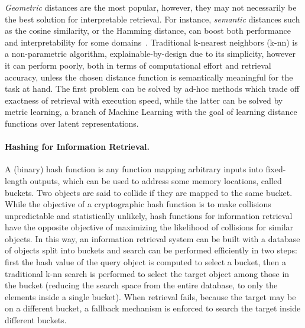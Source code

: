 \textit{Geometric} distances are the most popular, however, they may not necessarily be the best solution for interpretable retrieval. For instance, \textit{semantic} distances such as the cosine similarity, or the Hamming distance, can boost both performance and interpretability for some domains~\cite{norouzi2012hamming}.
%
Traditional k-nearest neighbors (k-nn) is a non-parametric algorithm, explainable-by-design due to its simplicity, however it can perform poorly, both in terms of computational effort and retrieval accuracy, unless the chosen distance function is semantically meaningful for the task at hand.
The first problem can be solved by ad-hoc methods which trade off exactness of retrieval with execution speed, while the latter can be solved by metric learning, a branch of Machine Learning with the goal of learning distance functions over latent representations.
%

\paragraph{Hashing for Information Retrieval.} A (binary) hash function is any function mapping arbitrary inputs into fixed-length outputs, which can be used to address some memory locations, called buckets. Two objects are said to collide if they are mapped to the same bucket.
While the objective of a cryptographic hash function is to make collisions unpredictable and statistically unlikely, hash functions for information retrieval have the opposite objective of maximizing the likelihood of collisions for similar objects.
In this way, an information retrieval system can be built with a database of objects split into buckets and search can be performed efficiently in two steps: first the hash value of the query object is computed to select a bucket, then a traditional k-nn search is performed to select the target object among those in the bucket (reducing the search space from the entire database, to only the elements inside a single bucket). When retrieval fails, because the target may be on a different bucket, a fallback mechanism is enforced to search the target inside different buckets.


